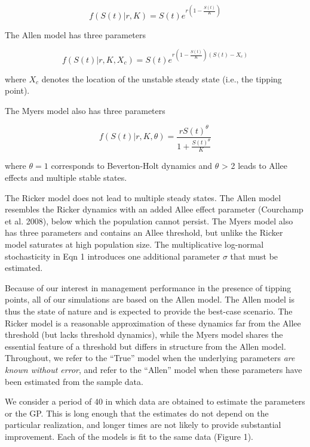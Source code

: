\documentclass[author-year, 12pt,review]{components/elsarticle} %
\begin{document}
\begin{equation}
f(S(t)|r,K) = S(t) e^{r \left(1 - \frac{S(t)}{K} \right) } \label{ricker}
\end{equation}

The Allen model has three parameters

\begin{equation}
f(S(t)|r, K, X_c) = S(t) e^{r \left(1 - \frac{S(t)}{K}\right)\left(S(t) - X_c\right)} \label{allen}
\end{equation}

where $X_c$ denotes the location of the unstable steady state (i.e., the
tipping point).

The Myers model also has three parameters

\begin{equation}
f(S(t) | r, K, \theta)  = \frac{r S(t)^{\theta}}{1 + \frac{S(t)^\theta}{K}} \label{myers}
\end{equation}

where $\theta = 1$ corresponds to Beverton-Holt dynamics and $\theta$
\textgreater{} 2 leads to Allee effects and multiple stable states.

The Ricker model does not lead to multiple steady states. The Allen
model resembles the Ricker dynamics with an added Allee effect parameter
(Courchamp et al. 2008), below which the population cannot persist. The
Myers model also has three parameters and contains an Allee threshold,
but unlike the Ricker model saturates at high population size. The
multiplicative log-normal stochasticity in Eqn 1 introduces one
additional parameter $\sigma$ that must be estimated.

Because of our interest in management performance in the presence of
tipping points, all of our simulations are based on the Allen model. The
Allen model is thus the state of nature and is expected to provide the
best-case scenario. The Ricker model is a reasonable approximation of
these dynamics far from the Allee threshold (but lacks threshold
dynamics), while the Myers model shares the essential feature of a
threshold but differs in structure from the Allen model. Throughout, we
refer to the ``True'' model when the underlying parameters \emph{are
known without error}, and refer to the ``Allen'' model when these
parameters have been estimated from the sample data.

We consider a period of 40 in which data are obtained to estimate the
parameters or the GP. This is long enough that the estimates do not
depend on the particular realization, and longer times are not likely to
provide substantial improvement. Each of the models is fit to the same
data (Figure 1).
\end{document}

